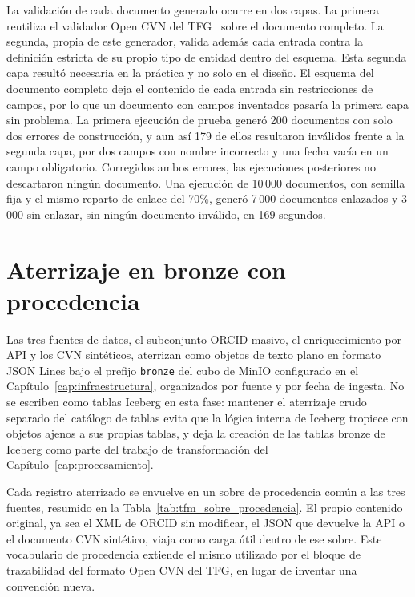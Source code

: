 La validación de cada documento generado ocurre en dos capas. La primera
reutiliza el validador Open CVN del TFG~\cite{tfg_open_cvn} sobre el
documento completo. La segunda, propia de este generador, valida además
cada entrada contra la definición estricta de su propio tipo de entidad
dentro del esquema. Esta segunda capa resultó necesaria en la práctica y
no solo en el diseño. El esquema del documento completo deja el contenido
de cada entrada sin restricciones de campos, por lo que un documento con
campos inventados pasaría la primera capa sin problema. La primera
ejecución de prueba generó 200 documentos con solo dos errores de
construcción, y aun así 179 de ellos resultaron inválidos frente a la
segunda capa, por dos campos con nombre incorrecto y una fecha vacía en un
campo obligatorio. Corregidos ambos errores, las ejecuciones posteriores
no descartaron ningún documento. Una ejecución de 10\,000 documentos, con
semilla fija y el mismo reparto de enlace del 70\%, generó 7\,000
documentos enlazados y 3\,000 sin enlazar, sin ningún documento inválido,
en 169 segundos.

\section{Aterrizaje en bronze con procedencia}
\label{sec:ingesta_bronze}

Las tres fuentes de datos, el subconjunto ORCID masivo, el enriquecimiento
por API y los CVN sintéticos, aterrizan como objetos de texto plano en
formato JSON Lines bajo el prefijo \texttt{bronze} del cubo de MinIO
configurado en el Capítulo~\ref{cap:infraestructura}, organizados por
fuente y por fecha de ingesta. No se escriben como tablas Iceberg en esta
fase: mantener el aterrizaje crudo separado del catálogo de tablas evita
que la lógica interna de Iceberg tropiece con objetos ajenos a sus propias
tablas, y deja la creación de las tablas bronze de Iceberg como parte del
trabajo de transformación del Capítulo~\ref{cap:procesamiento}.

Cada registro aterrizado se envuelve en un sobre de procedencia común a
las tres fuentes, resumido en la Tabla~\ref{tab:tfm_sobre_procedencia}. El
propio contenido original, ya sea el XML de ORCID sin modificar, el JSON
que devuelve la API o el documento CVN sintético, viaja como carga útil
dentro de ese sobre. Este vocabulario de procedencia extiende el mismo
utilizado por el bloque de trazabilidad del formato Open CVN del TFG, en
lugar de inventar una convención nueva.

